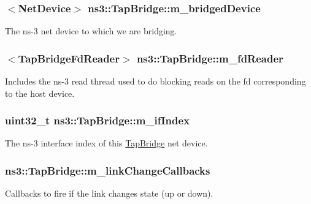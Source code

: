 \subsubsection[{\texorpdfstring{m\+\_\+bridged\+Device}{m_bridgedDevice}}]{$<${\bf Net\+Device}$>$ ns3\+::\+Tap\+Bridge\+::m\+\_\+bridged\+Device\hspace{0.3cm}{\ttfamily [private]}}\hypertarget{classns3_1_1TapBridge_ac4ba97368116b628d632d318d5562420}{}\label{classns3_1_1TapBridge_ac4ba97368116b628d632d318d5562420}
The ns-\/3 net device to which we are bridging. 
\subsubsection[{\texorpdfstring{m\+\_\+fd\+Reader}{m_fdReader}}]{$<${\bf Tap\+Bridge\+Fd\+Reader}$>$ ns3\+::\+Tap\+Bridge\+::m\+\_\+fd\+Reader\hspace{0.3cm}{\ttfamily [private]}}\hypertarget{classns3_1_1TapBridge_a8a26ef8616fb40272a4bab45ec84f563}{}\label{classns3_1_1TapBridge_a8a26ef8616fb40272a4bab45ec84f563}
Includes the ns-\/3 read thread used to do blocking reads on the fd corresponding to the host device. 
\subsubsection[{\texorpdfstring{m\+\_\+if\+Index}{m_ifIndex}}]{\setlength{\rightskip}{0pt plus 5cm}uint32\+\_\+t ns3\+::\+Tap\+Bridge\+::m\+\_\+if\+Index\hspace{0.3cm}{\ttfamily [private]}}\hypertarget{classns3_1_1TapBridge_a5de0f6399c095a680978c72bcd90b228}{}\label{classns3_1_1TapBridge_a5de0f6399c095a680978c72bcd90b228}
The ns-\/3 interface index of this \hyperlink{classns3_1_1TapBridge}{Tap\+Bridge} net device. 
\subsubsection[{\texorpdfstring{m\+\_\+link\+Change\+Callbacks}{m_linkChangeCallbacks}}]{ ns3\+::\+Tap\+Bridge\+::m\+\_\+link\+Change\+Callbacks\hspace{0.3cm}{\ttfamily [private]}}\hypertarget{classns3_1_1TapBridge_a3c5c9f53b15fc47d55420f4905297a06}{}\label{classns3_1_1TapBridge_a3c5c9f53b15fc47d55420f4905297a06}
Callbacks to fire if the link changes state (up or down). 
